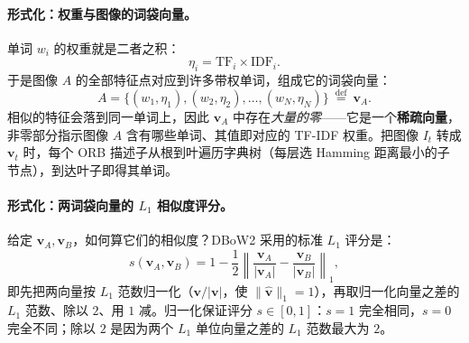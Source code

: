 \paragraph{形式化：权重与图像的词袋向量。}
单词 $w_i$ 的权重就是二者之积：
\begin{equation}
  \eta_i = \mathrm{TF}_i \times \mathrm{IDF}_i.
  \label{eq:loop-weight}
\end{equation}
于是图像 $A$ 的全部特征点对应到许多带权单词，组成它的词袋向量\cite{gaoxiang2019slam14}：
\begin{equation}
  A = \{(w_1,\eta_1),(w_2,\eta_2),\dots,(w_N,\eta_N)\}\ \stackrel{\mathrm{def}}{=}\ \boldsymbol v_A.
  \label{eq:loop-bowvec}
\end{equation}
相似的特征会落到同一单词上，因此 $\boldsymbol v_A$ 中存在\emph{大量的零}——它是一个\textbf{稀疏向量}，非零部分指示图像 $A$ 含有哪些单词、其值即对应的 TF-IDF 权重。把图像 $I_t$ 转成 $\boldsymbol v_t$ 时，每个 ORB 描述子从根到叶遍历字典树（每层选 Hamming 距离最小的子节点），到达叶子即得其单词\cite{galvez2012bags}。

\paragraph{形式化：两词袋向量的 $L_1$ 相似度评分。}
给定 $\boldsymbol v_A,\boldsymbol v_B$，如何算它们的相似度？DBoW2 采用的标准 $L_1$ 评分是\cite{galvez2012bags}：
\begin{equation}
  s(\boldsymbol v_A,\boldsymbol v_B)=1-\frac{1}{2}\left\lVert\frac{\boldsymbol v_A}{\lvert\boldsymbol v_A\rvert}-\frac{\boldsymbol v_B}{\lvert\boldsymbol v_B\rvert}\right\rVert_1,
  \label{eq:loop-dbow-score}
\end{equation}
即先把两向量按 $L_1$ 范数归一化（$\boldsymbol v/\lvert\boldsymbol v\rvert$，使 $\lVert\widehat{\boldsymbol v}\rVert_1=1$），再取归一化向量之差的 $L_1$ 范数、除以 $2$、用 $1$ 减。归一化保证评分 $s\in[0,1]$：$s=1$ 完全相同，$s=0$ 完全不同；除以 $2$ 是因为两个 $L_1$ 单位向量之差的 $L_1$ 范数最大为 $2$。

